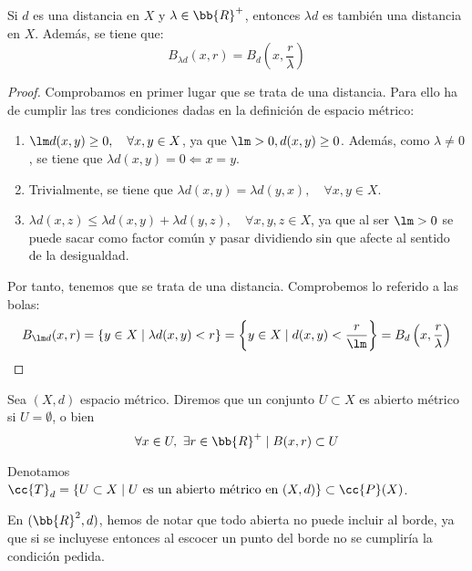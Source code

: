 \begin{prop}
    Si $d$ es una distancia en $X$ y $\lambda\in \bb{R}^+$, entonces $\lambda d$ es también una distancia en $X$. Además, se tiene que:
    \begin{equation*}
        B_{\lambda d}(x,r) = B_d\left(x, \frac{r}{\lambda}\right)
    \end{equation*}
\end{prop}
\begin{proof}
    Comprobamos en primer lugar que se trata de una distancia. Para ello ha de cumplir las tres condiciones dadas en la definición de espacio métrico:
    \begin{enumerate}
        \item $\lm d(x,y)\geq 0, \quad \forall x,y\in X$, ya que $\lm>0, d(x,y)\geq 0$. Además, como $\lambda\neq 0$, se tiene que $\lambda d(x,y)=0 \Longleftarrow x=y$.

        \item Trivialmente, se tiene que $\lambda d(x,y)=\lambda d(y,x), \quad \forall x,y\in X$.

        \item $\lambda d(x,z)\leq \lambda d(x,y) + \lambda d(y,z), \quad \forall x,y,z\in X$, ya que al ser $\lm>0$ se puede sacar como factor común y pasar dividiendo sin que afecte al sentido de la desigualdad.
    \end{enumerate}

    Por tanto, tenemos que se trata de una distancia. Comprobemos lo referido a las bolas:
    \begin{equation*}
        B_{\lm d}(x,r)
        = \{y\in X \mid \lambda d(x,y)<r\}
        = \left\{y\in X \mid d(x,y)<\dfrac{r}{\lm}\right\}
        = B_d\left(x, \frac{r}{\lambda}\right)
    \end{equation*}
\end{proof}

\begin{definicion}
Sea $(X,d)$ espacio métrico. Diremos que un conjunto $U\subset X$ es abierto métrico si $U=\emptyset$, o bien
$$\forall x\in U,~\exists r\in \bb{R}^+\mid B(x,r)\subset U$$

Denotamos $\cc{T}_d=\{U\subset X\mid U\text{ es un abierto métrico en } (X,d)\}\subset \cc{P}(X)$. 
\end{definicion}

\begin{ejemplo}
    En $(\bb{R}^2, d)$, hemos de notar que todo abierta no puede incluir al borde, ya que si se incluyese entonces al escocer un punto del borde no se cumpliría la condición pedida.
\end{ejemplo}


